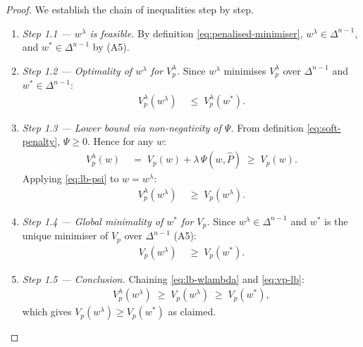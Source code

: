 \documentclass[12pt,openany]{book}
\newcommand{\bfw}{\mathbf{w}}
\numberwithin{equation}{chapter}
\theoremstyle{plain}
\theoremstyle{definition}
\theoremstyle{remark}
\def\bfw{w}%
\begin{document}
\begin{proof}
We establish the chain of inequalities step by step.
\begin{enumerate}
  \item \emph{Step 1.1 — $\bfw^\lambda$ is feasible.}
        By definition \eqref{eq:penalised-minimiser},
        $\bfw^\lambda \in \Delta^{n-1}$, and $\bfw^* \in \Delta^{n-1}$
        by (A5).

  \item \emph{Step 1.2 — Optimality of $\bfw^\lambda$ for
        $V_p^\lambda$.}
        Since $\bfw^\lambda$ minimises $V_p^\lambda$ over
        $\Delta^{n-1}$ and $\bfw^* \in \Delta^{n-1}$:
        \begin{align}
          V_p^\lambda(\bfw^\lambda)
          &\;\leq\; V_p^\lambda(\bfw^*).
          \label{eq:opt-ineq}
        \end{align}

  \item \emph{Step 1.3 — Lower bound via non-negativity of $\Psi$.}
        From definition \eqref{eq:soft-penalty}, $\Psi \geq 0$.
        Hence for any $\bfw$:
        \begin{align}
          V_p^\lambda(\bfw)
          &\;=\; V_p(\bfw) + \lambda\,\Psi(\bfw,\hat{P})
          \;\geq\; V_p(\bfw).
          \label{eq:lb-psi}
        \end{align}
        Applying \eqref{eq:lb-psi} to $\bfw = \bfw^\lambda$:
        \begin{align}
          V_p^\lambda(\bfw^\lambda)
          &\;\geq\; V_p(\bfw^\lambda).
          \label{eq:lb-wlambda}
        \end{align}

  \item \emph{Step 1.4 — Global minimality of $\bfw^*$ for $V_p$.}
        Since $\bfw^\lambda \in \Delta^{n-1}$ and $\bfw^*$ is the
        unique minimiser of $V_p$ over $\Delta^{n-1}$ (A5):
        \begin{align}
          V_p(\bfw^\lambda) &\;\geq\; V_p(\bfw^*).
          \label{eq:vp-lb}
        \end{align}

  \item \emph{Step 1.5 — Conclusion.}
        Chaining \eqref{eq:lb-wlambda} and \eqref{eq:vp-lb}:
        \begin{align}
          V_p^\lambda(\bfw^\lambda)
          \;\geq\; V_p(\bfw^\lambda)
          \;\geq\; V_p(\bfw^*),
          \label{eq:chain1}
        \end{align}
        which gives $V_p(\bfw^\lambda) \geq V_p(\bfw^*)$ as claimed.


\end{enumerate}
\end{proof}
\end{document}
